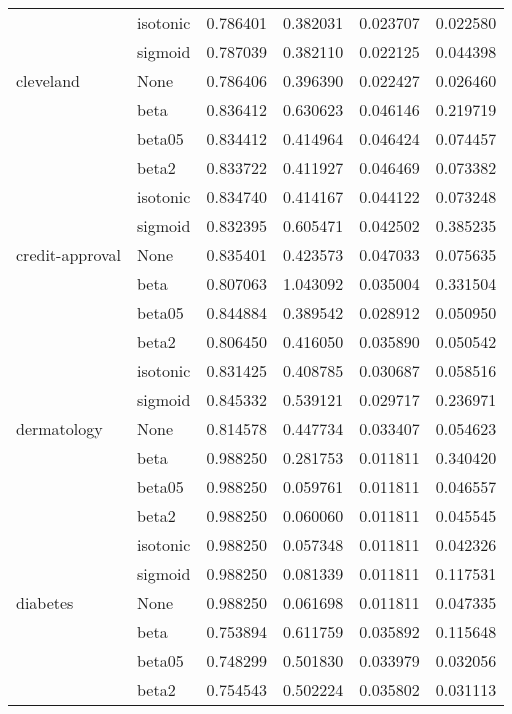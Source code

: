 \begin{tabular}{llrrrr}
        & isotonic &  0.786401 &   0.382031 &  0.023707 &  0.022580 \\
        & sigmoid &  0.787039 &   0.382110 &  0.022125 &  0.044398 \\
cleveland & None &  0.786406 &   0.396390 &  0.022427 &  0.026460 \\
        & beta &  0.836412 &   0.630623 &  0.046146 &  0.219719 \\
        & beta05 &  0.834412 &   0.414964 &  0.046424 &  0.074457 \\
        & beta2 &  0.833722 &   0.411927 &  0.046469 &  0.073382 \\
        & isotonic &  0.834740 &   0.414167 &  0.044122 &  0.073248 \\
        & sigmoid &  0.832395 &   0.605471 &  0.042502 &  0.385235 \\
credit-approval & None &  0.835401 &   0.423573 &  0.047033 &  0.075635 \\
        & beta &  0.807063 &   1.043092 &  0.035004 &  0.331504 \\
        & beta05 &  0.844884 &   0.389542 &  0.028912 &  0.050950 \\
        & beta2 &  0.806450 &   0.416050 &  0.035890 &  0.050542 \\
        & isotonic &  0.831425 &   0.408785 &  0.030687 &  0.058516 \\
        & sigmoid &  0.845332 &   0.539121 &  0.029717 &  0.236971 \\
dermatology & None &  0.814578 &   0.447734 &  0.033407 &  0.054623 \\
        & beta &  0.988250 &   0.281753 &  0.011811 &  0.340420 \\
        & beta05 &  0.988250 &   0.059761 &  0.011811 &  0.046557 \\
        & beta2 &  0.988250 &   0.060060 &  0.011811 &  0.045545 \\
        & isotonic &  0.988250 &   0.057348 &  0.011811 &  0.042326 \\
        & sigmoid &  0.988250 &   0.081339 &  0.011811 &  0.117531 \\
diabetes & None &  0.988250 &   0.061698 &  0.011811 &  0.047335 \\
        & beta &  0.753894 &   0.611759 &  0.035892 &  0.115648 \\
        & beta05 &  0.748299 &   0.501830 &  0.033979 &  0.032056 \\
        & beta2 &  0.754543 &   0.502224 &  0.035802 &  0.031113 \\

\end{tabular}
